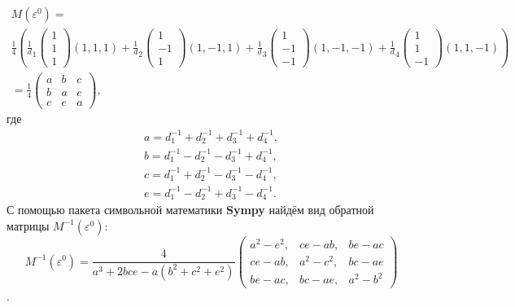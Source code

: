 	\begin{multline*}
		M(\varepsilon^0) = \\ 
		\frac 1 4 \left(
			\frac 1 d_1 \begin{pmatrix} 1 \\ 1 \\ 1 \end{pmatrix} (1, 1, 1) + 
			\frac 1 d_2 \begin{pmatrix} 1 \\ -1 \\ 1 \end{pmatrix} (1, -1, 1) + 
			\frac 1 d_3 \begin{pmatrix} 1 \\ -1 \\ -1 \end{pmatrix} (1, -1, -1) +
			\frac 1 d_4 \begin{pmatrix} 1 \\ 1 \\ -1 \end{pmatrix} (1, 1, -1)
		\right) \\ =
		\frac 1  4
		\begin{pmatrix}
			a & b & c \\
			b & a & e \\
			c & e & a
		\end{pmatrix},
	\end{multline*}
	где
	\begin{equation}\label{theorem-4p:defs} \begin{split}
		a=d_1^{-1}+d_2^{-1}+d_3^{-1} + d_4^{-1},\\
		b=d_1^{-1}-d_2^{-1}-d_3^{-1} + d_4^{-1},\\
		c=d_1^{-1}+d_2^{-1}-d_3^{-1} - d_4^{-1},\\
		e=d_1^{-1}-d_2^{-1}+d_3^{-1} - d_4^{-1}.
	\end{split}\end{equation}
	С помощью пакета символьной математики \textbf{Sympy} найдём вид обратной матрицы $M^{-1}(\varepsilon^0)$:
	\begin{equation} \label{theorem-4p:inv-matrix}
		M^{-1}(\varepsilon^0) = \frac 4 {a^3 + 2 b c e - a(b^2 + c^2 + e^2)}
		\begin{pmatrix}
			a^2 - e^2,& ce - ab, & be - ac\\
			ce - ab,& a^2-c^2,& bc-ae\\
			be - ac,& bc - ae,& a^2 - b^2			
		\end{pmatrix} 
	\end{equation}.	
	
